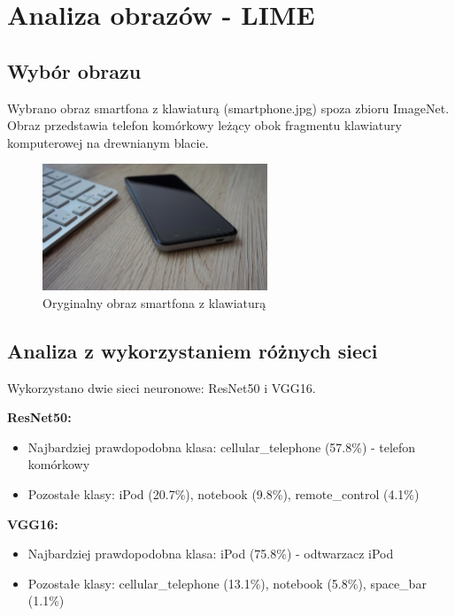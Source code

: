 \documentclass[12pt,a4paper]{article}
\begin{document}
\section{Analiza obrazów - LIME}

\subsection{Wybór obrazu}

Wybrano obraz smartfona z klawiaturą (smartphone.jpg) spoza zbioru ImageNet. Obraz przedstawia telefon komórkowy leżący obok fragmentu klawiatury komputerowej na drewnianym blacie.

\begin{figure}[H]
  \centering
  \includegraphics[width=0.6\textwidth]{../data/smartphone.jpg}
  \caption{Oryginalny obraz smartfona z klawiaturą}
\end{figure}

\subsection{Analiza z wykorzystaniem różnych sieci}

Wykorzystano dwie sieci neuronowe: ResNet50 i VGG16.

\textbf{ResNet50:}
\begin{itemize}
  \item Najbardziej prawdopodobna klasa: cellular\_telephone (57.8\%) - telefon komórkowy
  \item Pozostałe klasy: iPod (20.7\%), notebook (9.8\%), remote\_control (4.1\%)
\end{itemize}

\textbf{VGG16:}
\begin{itemize}
  \item Najbardziej prawdopodobna klasa: iPod (75.8\%) - odtwarzacz iPod
  \item Pozostałe klasy: cellular\_telephone (13.1\%), notebook (5.8\%), space\_bar (1.1\%)
\end{itemize}
\end{document}
